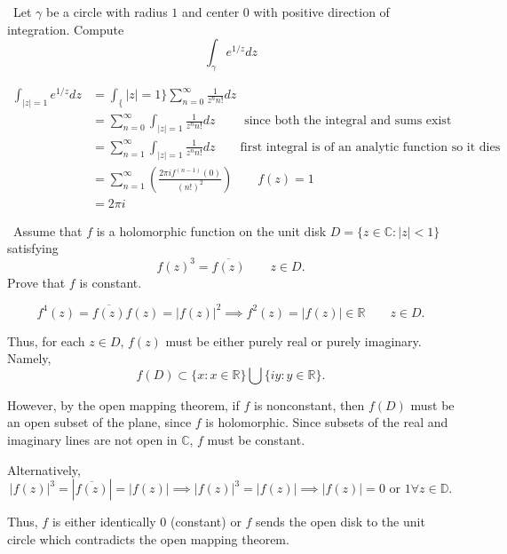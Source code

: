 \documentclass[12pt]{Qual}
\begin{document}
\begin{problem} $\,$
Let $\gamma$ be a circle with radius $1$ and center $0$ with positive direction of integration. Compute $$\int_\gamma e^{1/z}dz$$
\end{problem}


\begin{solution}$\,$
\begin{align*}
    \int_{|z|=1}e^{1/z}dz&=\int_\{|z|=1\}\sum_{n=0}^\infty\frac{1}{z^nn!}dz\\
    &=\sum_{n=0}^\infty\int_{|z|=1}\frac{1}{z^nn!}dz\qquad\text{ since both the integral and sums exist}\\
    &=\sum_{n=1}^\infty\int_{|z|=1}\frac{1}{z^nn!}dz\qquad\text{first integral is of an analytic function so it dies}\\
    &=\sum_{n=1}^\infty\left(\frac{2\pi if^{(n-1)}(0)}{(n!)^2}\right)\qquad f(z)=1\\
    &=2\pi i
\end{align*}
\end{solution}
\newpage



\begin{problem} $\,$
Assume that $f$ is a holomorphic function on the unit disk $D=\{z\in\mathbb{C}:|z|<1\}$ satisfying $$f(z)^3=\overline{f(z)}\qquad z\in D.$$ Prove that $f$ is constant.
\end{problem}

\begin{solution}$\,$
$$f^4(z)=\overline{f(z)}f(z)=|f(z)|^2\implies f^2(z)=|f(z)|\in\mathbb{R}\qquad z\in D.$$

Thus, for each $z\in D$, $f(z)$ must be either purely real or purely imaginary. Namely, $$f(D)\subset\{x:x\in\mathbb{R}\}\bigcup\{iy:y\in\mathbb{R}\}.$$

However, by the open mapping theorem, if $f$ is nonconstant, then $f(D)$ must be an open subset of the plane, since $f$ is holomorphic. Since subsets of the real and imaginary lines are not open in $\mathbb{C}$, $f$ must be constant.

\begin{mybox}
Alternatively, $$|f(z)|^3=|\overline{f(z)}|=|f(z)|\implies |f(z)|^3=|f(z)|\implies |f(z)|=0\text{ or }1\forall z\in\mathbb{D}.$$

Thus, $f$ is either identically $0$ (constant) or $f$ sends the open disk to the unit circle which contradicts the open mapping theorem.
\end{mybox}
\end{solution}
\newpage
\end{document}
